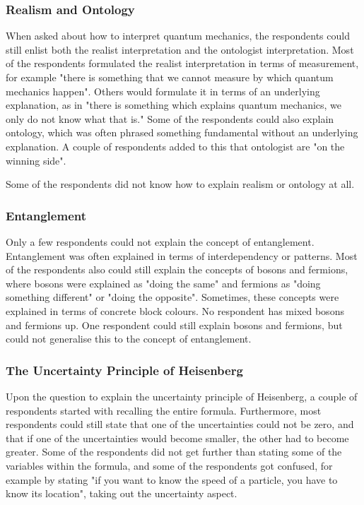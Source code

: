 \documentclass[11pt,twoside]{report} %
\begin{document}
\subsubsection{Realism and Ontology}

When asked about how to interpret quantum mechanics, the respondents could still enlist both the realist interpretation and the ontologist interpretation. Most of the respondents formulated the realist interpretation in terms of measurement, for example "there is something that we cannot measure by which quantum mechanics happen". Others would formulate it in terms of an underlying explanation, as in "there is something which explains quantum mechanics, we only do not know what that is." Some of the respondents could also explain ontology, which was often phrased something fundamental without an underlying explanation. A couple of respondents added to this that ontologist are "on the winning side".

Some of the respondents did not know how to explain realism or ontology at all.

\subsubsection{Entanglement}

Only a few respondents could not explain the concept of entanglement. Entanglement was often explained in terms of interdependency or patterns. Most of the respondents also could still explain the concepts of bosons and fermions, where bosons were explained as "doing the same" and fermions as "doing something different" or "doing the opposite". Sometimes, these concepts were explained in terms of concrete block colours. No respondent has mixed bosons and fermions up. One respondent could still explain bosons and fermions, but could not generalise this to the concept of entanglement.

\subsubsection{The Uncertainty Principle of Heisenberg}

Upon the question to explain the uncertainty principle of Heisenberg, a couple of respondents started with recalling the entire formula. Furthermore, most respondents could still state that one of the uncertainties could not be zero, and that if one of the uncertainties would become smaller, the other had to become greater. Some of the respondents did not get further than stating some of the variables within the formula, and some of the respondents got confused, for example by stating "if you want to know the speed of a particle, you have to know its location", taking out the uncertainty aspect.
\end{document}
